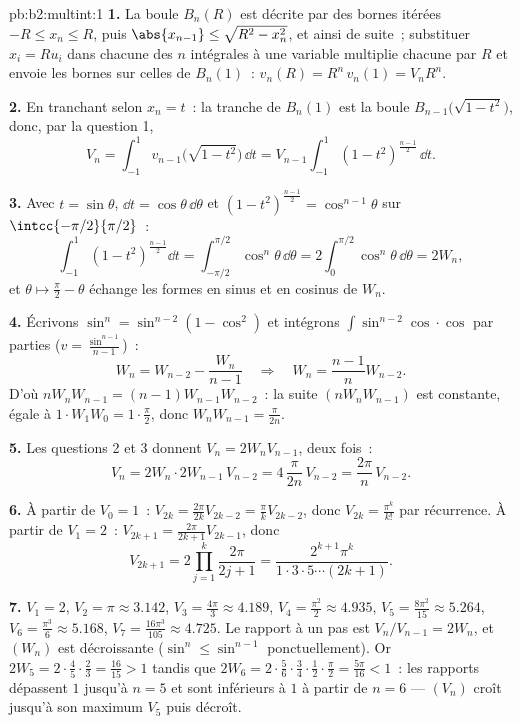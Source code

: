 \begin{solution}{pb:b2:multint:1}
\textbf{1.} La boule $B_n(R)$ est décrite par des bornes itérées
$-R \leq x_n \leq R$, puis $\abs{x_{n-1}} \leq \sqrt{R^2 -
x_n^2}$, et ainsi de suite~; substituer $x_i = Ru_i$ dans chacune des
$n$ intégrales à une variable multiplie chacune par $R$ et envoie
les bornes sur celles de $B_n(1)$~: $v_n(R) = R^n\,v_n(1) =
V_nR^n$.

\textbf{2.} En tranchant selon $x_n = t$~: la tranche de $B_n(1)$ est
la boule $B_{n-1}\bigl(\sqrt{1 - t^2}\bigr)$, donc, par la question
1,
\[
V_n = \int_{-1}^1 v_{n-1}\bigl(\sqrt{1 - t^2}\bigr)\,\dd t
= V_{n-1}\int_{-1}^{1}(1 - t^2)^{\frac{n-1}2}\,\dd t .
\]

\textbf{3.} Avec $t = \sin\theta$, $\dd t =
\cos\theta\,\dd\theta$ et $(1 - t^2)^{\frac{n-1}2} =
\cos^{n-1}\theta$ sur $\intcc{-\pi/2}{\pi/2}$~:
\[
\int_{-1}^1(1 - t^2)^{\frac{n-1}2}\dd t
= \int_{-\pi/2}^{\pi/2}\cos^n\theta\,\dd\theta
= 2\int_0^{\pi/2}\cos^n\theta\,\dd\theta = 2W_n,
\]
et $\theta \mapsto \frac\pi2 - \theta$ échange les formes en sinus
et en cosinus de $W_n$.

\textbf{4.} Écrivons $\sin^n = \sin^{n-2}(1 - \cos^2)$ et
intégrons $\int\sin^{n-2}\cos\cdot\cos$ par parties ($v =
\frac{\sin^{n-1}}{n-1}$)~:
\[
W_n = W_{n-2} - \frac{W_n}{n-1}
\quad\Longrightarrow\quad
W_n = \frac{n-1}{n}W_{n-2}.
\]
D'où $nW_nW_{n-1} = (n-1)W_{n-1}W_{n-2}$~: la suite
$(nW_nW_{n-1})$ est constante, égale à $1\cdot W_1W_0 =
1\cdot\frac\pi2$, donc $W_nW_{n-1} = \frac{\pi}{2n}$.

\textbf{5.} Les questions 2 et 3 donnent $V_n = 2W_nV_{n-1}$, deux fois~:
\[
V_n = 2W_n\cdot 2W_{n-1}\,V_{n-2}
= 4\,\frac{\pi}{2n}\,V_{n-2} = \frac{2\pi}n\,V_{n-2}.
\]

\textbf{6.} À partir de $V_0 = 1$~: $V_{2k} = \frac{2\pi}{2k}V_{2k-2}
= \frac\pi kV_{2k-2}$, donc $V_{2k} = \frac{\pi^k}{k!}$ par
récurrence. À partir de $V_1 = 2$~: $V_{2k+1} =
\frac{2\pi}{2k+1}V_{2k-1}$, donc
\[
V_{2k+1} = 2\prod_{j=1}^k\frac{2\pi}{2j+1}
= \frac{2^{k+1}\pi^k}{1\cdot3\cdot5\cdots(2k+1)} .
\]

\textbf{7.} $V_1 = 2$, $V_2 = \pi \approx 3.142$, $V_3 =
\frac{4\pi}3 \approx 4.189$, $V_4 = \frac{\pi^2}2 \approx
4.935$, $V_5 = \frac{8\pi^2}{15} \approx 5.264$, $V_6 =
\frac{\pi^3}6 \approx 5.168$, $V_7 = \frac{16\pi^3}{105}
\approx 4.725$. Le rapport à un pas est $V_n/V_{n-1} = 2W_n$,
et $(W_n)$ est décroissante ($\sin^n \leq \sin^{n-1}$
ponctuellement). Or $2W_5 = 2\cdot\frac45\cdot\frac23 =
\frac{16}{15} > 1$ tandis que $2W_6 =
2\cdot\frac56\cdot\frac34\cdot\frac12\cdot\frac\pi2 =
\frac{5\pi}{16} < 1$~: les rapports dépassent $1$ jusqu'à $n = 5$ et
sont inférieurs à $1$ à partir de $n = 6$ --- $(V_n)$ croît jusqu'à son
maximum $V_5$ puis décroît.


\end{solution}
